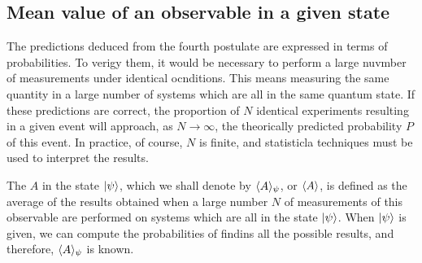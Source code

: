 \subsection{Mean value of an observable in a given state}
The predictions deduced from the fourth postulate are expressed in terms of probabilities. To verigy them, it would be necessary to perform a large nuvmber of measurements
under identical ocnditions. This means measuring the same quantity in a large number of systems which are all in the same quantum state.
If these predictions are correct, the proportion of $N$ identical experiments resulting in a given event will approach, as $N\to\infty$, the 
theorically predicted probability $P$ of this event. In practice, of course, $N$ is finite, and statisticla techniques must be used to interpret the results.

The  $A$ in the state $|\psi\rangle$, which we shall denote by 
$\langle A\rangle_\psi$, or $\langle A\rangle$, is defined as the average of the results obtained when a large number $N$ of measurements of this observable are performed
on systems which are all in the state $|\psi\rangle$. When $|\psi\rangle$ is given, we can compute the probabilities of findins all the possible results, 
and therefore, $\langle A\rangle_\psi$ is known.

